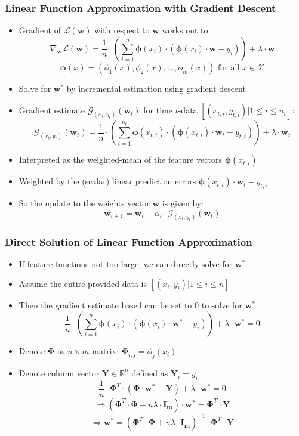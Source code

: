 \documentclass{beamer}
\begin{document}
\begin{frame}
\frametitle{Linear Function Approximation with Gradient Descent}
\pause
\begin{itemize}[<+->]
\item Gradient of $\mathcal{L}(\bm{w})$ with respect to $\bm{w}$ works out to:
$$\nabla_{\bm{w}} \mathcal{L}(\bm{w}) = \frac 1 n \cdot (\sum_{i=1}^n \bm{\phi}(x_i) \cdot (\bm{\phi}(x_i) \cdot \bm{w} - y_i)) + \lambda \cdot \bm{w}$$
$$\bm{\phi}(x) = (\phi_1(x), \phi_2(x), \ldots, \phi_m(x)) \text{ for all } x \in \mathcal{X}$$
\item Solve for $\bm{w^*}$ by incremental estimation using gradient descent
\item Gradient estimate $\mathcal{G}_{(x_t,y_t)}(\bm{w}_t)$ for time $t$-data $[(x_{t,i}, y_{t,i})|1 \leq i \leq n_t]$:
$$\mathcal{G}_{(x_t, y_t)}(\bm{w}_t) = \frac 1 n \cdot (\sum_{i=1}^{n_t} \bm{\phi}(x_{t,i}) \cdot (\bm{\phi}(x_{t,i}) \cdot \bm{w}_t - y_{t,i})) + \lambda \cdot \bm{w}_t$$
\item Interpreted as the weighted-mean of the feature vectors $\bm{\phi}(x_{t,i})$
\item Weighted by the (scalar) linear prediction errors $\bm{\phi}(x_{t,i}) \cdot \bm{w}_t - y_{t,i}$
\item So the update to the weights vector $\bm{w}$ is given by:
$$\bm{w}_{t+1} = \bm{w}_t - \alpha_t \cdot \mathcal{G}_{(x_t, y_t)}(\bm{w}_t)$$
\end{itemize}
\end{frame}

\begin{frame}
\frametitle{Direct Solution of Linear Function Approximation}
\pause
\begin{itemize}[<+->]
\item If feature functions not too large, we can directly solve for $\bm{w^*}$ 
\item Assume the entire provided data is $[(x_i, y_i)|1\leq i \leq n]$
\item Then the gradient estimate based can be set to 0 to solve for $\bm{w^*}$
$$\frac 1 n \cdot (\sum_{i=1}^n \bm{\phi}(x_i) \cdot (\bm{\phi}(x_i) \cdot \bm{w^*} - y_i)) + \lambda \cdot \bm{w^*} = 0$$
\item Denote $\bm{\Phi}$ as $n \times m$ matrix: $\bm{\Phi}_{i,j} = \phi_j(x_i)$
\item Denote column vector $\bm{Y} \in \mathbb{R}^n$ defined as $\bm{Y}_i = y_i$
$$\frac 1 n \cdot \bm{\Phi}^T \cdot (\bm{\Phi} \cdot \bm{w^*} - \bm{Y}) + \lambda \cdot \bm{w^*} = 0$$
$$\Rightarrow (\bm{\Phi}^T \cdot \bm{\Phi} + n \lambda \cdot \bm{I_m}) \cdot \bm{w^*} = \bm{\Phi}^T \cdot \bm{Y}$$
$$\Rightarrow \bm{w^*} = (\bm{\Phi}^T \cdot \bm{\Phi} + n \lambda \cdot \bm{I_m})^{-1} \cdot \bm{\Phi}^T \cdot \bm{Y}$$
\end{itemize}
\end{frame}
\end{document}
